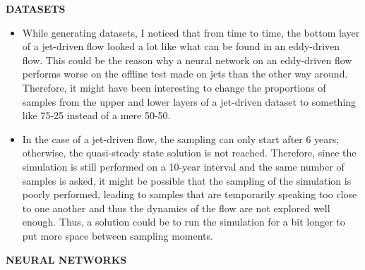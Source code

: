 \vspace{1em}
\textbf{DATASETS}

\begin{itemize}
	\item While generating datasets, I noticed that from time to time, the bottom layer of a jet-driven flow looked a lot like what can be found in an eddy-driven flow. This could be the reason why a neural network on an eddy-driven flow performs worse on the offline test made on jets than the other way around. Therefore, it might have been interesting to change the proportions of samples from the upper and lower layers of a jet-driven dataset to something like 75-25 instead of a mere 50-50.
	
	\item In the case of a jet-driven flow, the sampling can only start after 6 years; otherwise, the quasi-steady state solution is not reached. Therefore, since the simulation is still performed on a 10-year interval and the same number of samples is asked, it might be possible that the sampling of the simulation is poorly performed, leading to samples that are temporarily speaking too close to one another and thus the dynamics of the flow are not explored well enough. Thus, a solution could be to run the simulation for a bit longer to put more space between sampling moments.
\end{itemize}

\vspace{1em}
\textbf{NEURAL NETWORKS}

